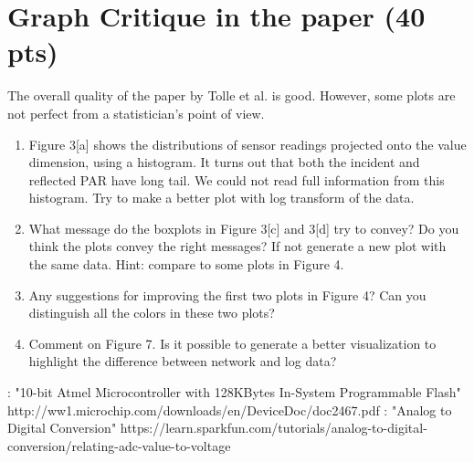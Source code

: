 \documentclass[11pt]{article}
\begin{document}
\section{Graph Critique in the paper (40 pts)}
The overall quality of the paper by Tolle et al. is good. However, some plots are not perfect from a statistician's point of view.
\begin{enumerate}[label=(\alph*)]
\item Figure 3[a] shows the distributions of sensor readings projected onto the value dimension, using a histogram. It turns out that both the incident and reflected PAR have long tail. We could not read full information from this histogram. Try to make a better plot with log transform of the data.
\item What message do the boxplots in Figure 3[c] and 3[d] try to convey? Do you think the plots convey the right messages? If not generate a new plot with the same data. Hint: compare to some plots in Figure 4.
\item Any suggestions for improving the first two plots in Figure 4? Can you distinguish all the colors in these two plots?
\item Comment on Figure 7. Is it possible to generate a better visualization to highlight the difference between network and log data?
\end{enumerate}

: "10-bit Atmel Microcontroller with 128KBytes In-System Programmable Flash" http://ww1.microchip.com/downloads/en/DeviceDoc/doc2467.pdf
: "Analog to Digital Conversion" https://learn.sparkfun.com/tutorials/analog-to-digital-conversion/relating-adc-value-to-voltage
\end{document}
